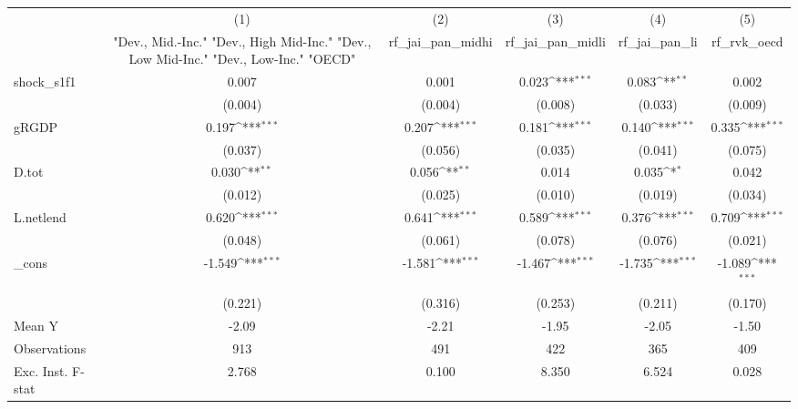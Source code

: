 {
\def\sym#1{\ifmmode^{#1}\else\(^{#1}\)\fi}
\begin{tabular}{l*{5}{c}}
\toprule
            &\multicolumn{1}{c}{(1)}&\multicolumn{1}{c}{(2)}&\multicolumn{1}{c}{(3)}&\multicolumn{1}{c}{(4)}&\multicolumn{1}{c}{(5)}\\
            &\multicolumn{1}{c}{ "Dev., Mid.-Inc." "Dev., High Mid-Inc." "Dev., Low Mid-Inc." "Dev., Low-Inc." "OECD" }&\multicolumn{1}{c}{rf\_jai\_pan\_midhi}&\multicolumn{1}{c}{rf\_jai\_pan\_midli}&\multicolumn{1}{c}{rf\_jai\_pan\_li}&\multicolumn{1}{c}{rf\_rvk\_oecd}\\
\midrule
shock\_s1f1  &       0.007         &       0.001         &       0.023\sym{***}&       0.083\sym{**} &       0.002         \\
            &     (0.004)         &     (0.004)         &     (0.008)         &     (0.033)         &     (0.009)         \\
\addlinespace
gRGDP       &       0.197\sym{***}&       0.207\sym{***}&       0.181\sym{***}&       0.140\sym{***}&       0.335\sym{***}\\
            &     (0.037)         &     (0.056)         &     (0.035)         &     (0.041)         &     (0.075)         \\
\addlinespace
D.tot       &       0.030\sym{**} &       0.056\sym{**} &       0.014         &       0.035\sym{*}  &       0.042         \\
            &     (0.012)         &     (0.025)         &     (0.010)         &     (0.019)         &     (0.034)         \\
\addlinespace
L.netlend   &       0.620\sym{***}&       0.641\sym{***}&       0.589\sym{***}&       0.376\sym{***}&       0.709\sym{***}\\
            &     (0.048)         &     (0.061)         &     (0.078)         &     (0.076)         &     (0.021)         \\
\addlinespace
\_cons      &      -1.549\sym{***}&      -1.581\sym{***}&      -1.467\sym{***}&      -1.735\sym{***}&      -1.089\sym{***}\\
            &     (0.221)         &     (0.316)         &     (0.253)         &     (0.211)         &     (0.170)         \\
\midrule
Mean Y      &       -2.09         &       -2.21         &       -1.95         &       -2.05         &       -1.50         \\
Observations&         913         &         491         &         422         &         365         &         409         \\
Exc. Inst. F-stat&       2.768         &       0.100         &       8.350         &       6.524         &       0.028         \\
\bottomrule
\end{tabular}
}
